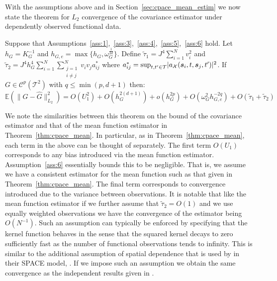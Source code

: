 With the assumptions above and in Section~\ref{sec:cpace_mean_estim} we now state the theorem for $L_2$ convergence of the covariance estimator under dependently observed functional data.

\begin{theorem}
	Suppose that Assumptions~\ref{ass:1},~\ref{ass:3},~\ref{ass:4},~\ref{ass:5},~\ref{ass:6} hold. 
	Let $h_G = K_G^{-1}$ and $h_{G,e} = \max\{h_{G}, \omega_G^{\frac{1}{2d}}\}$.
	Define $\tilde{\tau}_1 = J^4 \sum_{i=1}^N v_i^2$ and $\tilde{\tau}_2 =J^4 h_G^4 \sum_{i=1}^N \sum_{\substack{j=1 \\ i \ne j}}^N v_i v_j a_{ij}^* $ where $a_{ij}^* = \sup_{t, t^\prime \in \mathcal{T}} \lvert a_\mathcal{X}(\bm{{s}}_{i}, t, \bm{{s}}_{j}, t^\prime) \rvert^2$. 
	If $G \in \mathcal{C}^p\left(\mathcal{T}^2\right)$ with $q \le \min(p, d+1)$ then:
	\begin{equation}
		\mathbb{E}\left(\lVert G - \hat{G} \rVert_{L_2}^2\right) = O(U_1^2) + O(h_G^{2(d+1)}) + o(h_G^{2p}) + O(\omega_G^2 h_{G,e}^{-2q}) + O(\tilde{\tau}_1 + \tilde{\tau}_2)
	\end{equation}
\label{thm:cpace_cov}
\end{theorem}

We note the similarities between this theorem on the bound of the covariance estimator and that of the mean function estimator in Theorem~\ref{thm:cpace_mean}.
In particular, as in Theorem~\ref{thm:cpace_mean}, each term in the above can be thought of separately. 
The first term $O(U_1)$ corresponds to any bias introduced via the mean function estimator.
Assumption~\ref{ass:6} essentially bounds this to be negligible.
That is, we assume we have a consistent estimator for the mean function such as that given in Theorem~\ref{thm:cpace_mean}.
The final term corresponds to convergence introduced due to the variance between observations. 
It is notable that like the mean function estimator if we further assume that $\tilde{\tau}_2 = O(1)$ and we use equally weighted observations we have the convergence of the estimator being $O(N^{-1})$.
Such an assumption can typically be enforced by specifying that the kernel function behaves in the sense that the squared kernel decays to zero sufficiently fast as the number of functional observations tends to infinity.
This is similar to the additional assumption of spatial dependence that is used by \citeauthor{liu_functional_2017} in their SPACE model, \citep{liu_functional_2017}.
If we impose such an assumption we obtain the same convergence as the independent results given in \citep{xiao_asymptotic_2020}.


